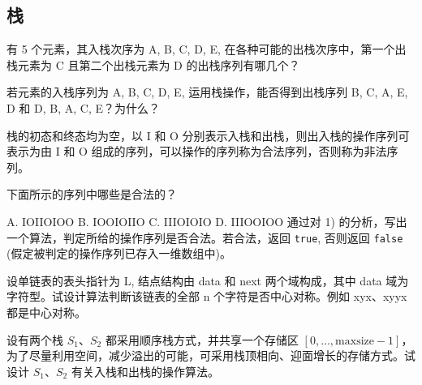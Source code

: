 \subsection{栈}

\begin{qitems}

    \begin{bbox}
        \qitem 有 5 个元素，其入栈次序为 A, B, C, D, E, 在各种可能的出栈次序中，第一个出栈元素为 C 且第二个出栈元素为 D 的出栈序列有哪几个？
    \end{bbox}

    \begin{bbox}
        \qitem 若元素的入栈序列为 A, B, C, D, E, 运用栈操作，能否得到出栈序列 B, C, A, E, D 和 D, B, A, C, E？为什么？
    \end{bbox}

    \begin{bbox}
        \qitem 栈的初态和终态均为空，以 I 和 O 分别表示入栈和出栈，则出入栈的操作序列可表示为由 I 和 O 组成的序列，可以操作的序列称为合法序列，否则称为非法序列。
        \begin{subqitems}
            \subqitem 下面所示的序列中哪些是合法的？
            
            A. IOIIOIOO \quad B. IOOIOIIO \quad C. IIIOIOIO \quad D. IIIOOIOO
            \subqitem 通过对 1) 的分析，写出一个算法，判定所给的操作序列是否合法。若合法，返回 \texttt{true}, 否则返回 \texttt{false} (假定被判定的操作序列已存入一维数组中)。
        \end{subqitems}
    \end{bbox}

    \begin{bbox}
        \qitem 设单链表的表头指针为 L, 结点结构由 data 和 next 两个域构成，其中 data 域为字符型。试设计算法判断该链表的全部 n 个字符是否中心对称。例如 xyx、xyyx 都是中心对称。
    \end{bbox}

    \begin{bbox}
        \qitem 设有两个栈 $S_1$、$S_2$ 都采用顺序栈方式，并共享一个存储区 $[0, \dots, \text{maxsize}-1]$，为了尽量利用空间，减少溢出的可能，可采用栈顶相向、迎面增长的存储方式。试设计 $S_1$、$S_2$ 有关入栈和出栈的操作算法。
    \end{bbox}

\end{qitems}
